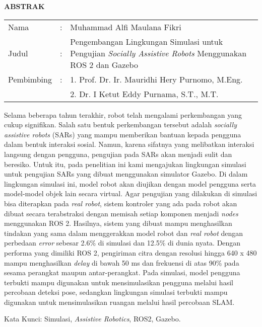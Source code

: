 \begin{center}
  \large\textbf{ABSTRAK}
\end{center}

\vspace{2ex}

\begingroup
  \setlength{\tabcolsep}{0pt}
  \noindent
  \begin{tabularx}{\textwidth}{l >{\centering}m{2em} X}
    Nama        &:& Muhammad Alfi Maulana Fikri \\
    Judul       &:&	Pengembangan Lingkungan Simulasi untuk Pengujian \emph{Socially Assistive Robots} Menggunakan ROS 2 dan Gazebo \\
    Pembimbing  &:& 1. Prof. Dr. Ir. Mauridhi Hery Purnomo, M.Eng. \\
                & & 2. Dr. I Ketut Eddy Purnama, S.T., M.T. \\
  \end{tabularx}
\endgroup

Selama beberapa tahun terakhir,
  robot telah mengalami perkembangan yang cukup signifikan.
Salah satu bentuk perkembangan tersebut adalah \emph{socially assistive robots} (SARs) yang mampu memberikan bantuan kepada pengguna dalam bentuk interaksi sosial.
Namun,
  karena sifatnya yang melibatkan interaksi langsung dengan pengguna,
  pengujian pada SARs akan menjadi sulit dan beresiko.
Untuk itu,
  pada penelitian ini kami mengajukan lingkungan simulasi untuk pengujian SARs yang dibuat menggunakan simulator Gazebo.
Di dalam lingkungan simulasi ini,
  model robot akan diujikan dengan model pengguna serta model-model objek lain secara virtual.
Agar pengujian yang dilakukan di simulasi bisa diterapkan pada \emph{real robot},
  sistem kontroler yang ada pada robot akan dibuat secara terabstraksi dengan memisah setiap komponen menjadi \emph{nodes} menggunakan ROS 2.
Hasilnya,
  sistem yang dibuat mampu menghasilkan tindakan yang sama dalam menggerakkan model robot dan \emph{real robot} dengan perbedaan \emph{error} sebesar 2.6\% di simulasi dan 12.5\% di dunia nyata.
Dengan performa yang dimiliki ROS 2,
  pengiriman citra dengan resolusi hingga 640 x 480 mampu menghasilkan \emph{delay} di bawah 50 ms dan frekuensi di atas 90\% pada sesama perangkat maupun antar-perangkat.
Pada simulasi,
  model pengguna terbukti mampu digunakan untuk mensimulasikan pengguna melalui hasil percobaan deteksi pose,
  sedangkan lingkungan simulasi terbukti mampu digunakan untuk mensimulasikan ruangan melalui hasil percobaan SLAM.

Kata Kunci: Simulasi, \emph{Assistive Robotics}, ROS2, Gazebo.
